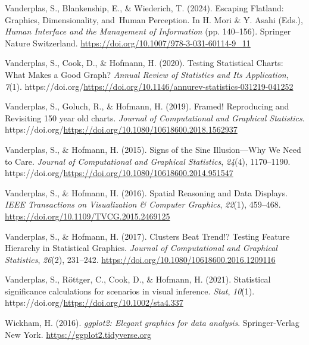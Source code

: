 \documentclass[
  10pt,
  letterpaper,
  DIV=11,
  numbers=noendperiod]{scrartcl}
\newlength{\cslhangindent}
\newenvironment{CSLReferences}[2] %
 {\begin{list}{}{%
  \setlength{\itemindent}{0pt}
  \setlength{\leftmargin}{0pt}
  \setlength{\parsep}{0pt}
  \ifodd #1
   \setlength{\leftmargin}{\cslhangindent}
   \setlength{\itemindent}{-1\cslhangindent}
  \fi
  \setlength{\itemsep}{#2\baselineskip}}}
 {\end{list}}
\begin{document}
\begin{CSLReferences}{1}{0}
Vanderplas, S., Blankenship, E., \& Wiederich, T. (2024). Escaping
{Flatland}: {Graphics}, {Dimensionality}, and~{Human Perception}. In H.
Mori \& Y. Asahi (Eds.), \emph{Human {Interface} and the {Management} of
{Information}} (pp. 140--156). Springer Nature Switzerland.
\url{https://doi.org/10.1007/978-3-031-60114-9_11}

Vanderplas, S., Cook, D., \& Hofmann, H. (2020). Testing {Statistical}
{Charts}: {What} {Makes} a {Good} {Graph}? \emph{Annual Review of
Statistics and Its Application}, \emph{7}(1).
https://doi.org/\url{https://doi.org/10.1146/annurev-statistics-031219-041252}

Vanderplas, S., Goluch, R., \& Hofmann, H. (2019). Framed! {Reproducing}
and {Revisiting} 150 year old charts. \emph{Journal of Computational and
Graphical Statistics}.
https://doi.org/\url{https://doi.org/10.1080/10618600.2018.1562937}

Vanderplas, S., \& Hofmann, H. (2015). Signs of the {Sine}
{Illusion}---{Why} {We} {Need} to {Care}. \emph{Journal of Computational
and Graphical Statistics}, \emph{24}(4), 1170--1190.
https://doi.org/\url{https://doi.org/10.1080/10618600.2014.951547}

Vanderplas, S., \& Hofmann, H. (2016). Spatial {Reasoning} and {Data
Displays}. \emph{IEEE Transactions on Visualization \& Computer
Graphics}, \emph{22}(1), 459--468.
\url{https://doi.org/10.1109/TVCG.2015.2469125}

Vanderplas, S., \& Hofmann, H. (2017). Clusters {Beat} {Trend}!?
{Testing} {Feature} {Hierarchy} in {Statistical} {Graphics}.
\emph{Journal of Computational and Graphical Statistics}, \emph{26}(2),
231--242. \url{https://doi.org/10.1080/10618600.2016.1209116}

Vanderplas, S., Röttger, C., Cook, D., \& Hofmann, H. (2021).
Statistical significance calculations for scenarios in visual inference.
\emph{Stat}, \emph{10}(1).
https://doi.org/\url{https://doi.org/10.1002/sta4.337}

Wickham, H. (2016). \emph{ggplot2: Elegant graphics for data analysis}.
Springer-Verlag New York. \url{https://ggplot2.tidyverse.org}


\end{CSLReferences}
\end{document}
